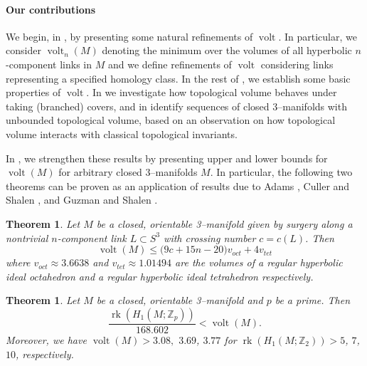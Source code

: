 \documentclass[a4paper]{gtart}
\newtheorem{theorem}[proposition]{Theorem}
\theoremstyle{definition}
\theoremstyle{remark}
\numberwithin{equation}{section}
\newcommand{\Z}{\mathbb{Z}}
\DeclareMathOperator{\volt}{volt}
\begin{document}
\paragraph{Our contributions}

We begin, in , by presenting some natural refinements of $\volt$. In particular, we consider $\volt_n(M)$ denoting the minimum over the volumes of all hyperbolic $n$-component links in $M$ and we define refinements of $\volt$ considering links representing a specified homology class. In the rest of , we establish some basic properties of $\volt$. In  we investigate how topological volume behaves under taking (branched) covers, and in  identify sequences of closed 3--manifolds with unbounded topological volume, based on an observation on how topological volume interacts with classical topological invariants.

In , we strengthen these results by presenting upper and lower bounds for $\volt(M)$ for arbitrary closed $3$--manifolds $M$. In particular, the following two theorems can be proven as an application of results due to Adams \cite{Adams_Augmented}, Culler and Shalen \cite{Culler_Shalen2011,Culler_Shalen2012}, and Guzman and Shalen \cite{Guzman_Shalen,Guzman_Shalen2020}. 

\begin{theorem}\label{thm:surgery_bound}
  Let $M$ be a closed, orientable 3--manifold given by surgery along a nontrivial $n$-component link $L\subset S^3$ with crossing number $c=c(L)$. Then 
  \begin{equation*}
  	\volt(M)\leq \big(9c+15n-20\big)v_{oct}+4v_{tet}
  \end{equation*}
  where $v_{oct}\approx3.6638$ and $v_{tet}\approx1.01494$ are the volumes of a regular hyperbolic ideal octahedron and a regular hyperbolic ideal tetrahedron respectively.
\end{theorem}

\begin{theorem}\label{thm:lower_bounds}
    Let $M$ be a closed, orientable 3--manifold and $p$ be a prime. Then
    \begin{equation*}
        \frac{\operatorname{rk}(H_1(M;\Z_p))}{168.602}< \volt(M).
    \end{equation*}
    Moreover, we have $\volt(M)>3.08,$ $3.69$, $3.77$ for $\operatorname{rk}(H_1(M;\Z_2))>5$, $7$, $10$, respectively.
\end{theorem}
\end{document}
